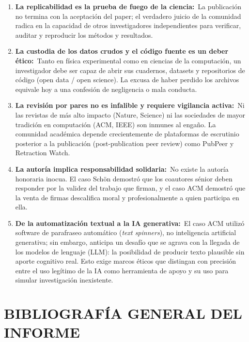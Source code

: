 \documentclass[12pt,a4paper]{article}
\newcommand{\itemlabel}[3]{\textbf{#1#2}~#3}
\let\oldsection\section
\renewcommand{\section}[1]{\needspace{5\baselineskip}\oldsection{#1}}
\begin{document}
\begin{enumerate}
\item \itemlabel{La replicabilidad es la prueba de fuego de la ciencia}{:}{La publicación no termina con la aceptación del paper; el verdadero juicio de la comunidad radica en la capacidad de otros investigadores independientes para verificar, auditar y reproducir los métodos y resultados.}
\item \itemlabel{La custodia de los datos crudos y el código fuente es un deber ético}{:}{Tanto en física experimental como en ciencias de la computación, un investigador debe ser capaz de abrir sus cuadernos, datasets y repositorios de código (open data / open science). La excusa de \textquotedbl{}haber perdido los archivos\textquotedbl{} equivale hoy a una confesión de negligencia o mala conducta.}
\item \itemlabel{La revisión por pares no es infalible y requiere vigilancia activa}{:}{Ni las revistas de más alto impacto (Nature, Science) ni las sociedades de mayor tradición en computación (ACM, IEEE) son inmunes al engaño. La comunidad académica depende crecientemente de plataformas de escrutinio posterior a la publicación (post-publication peer review) como PubPeer y Retraction Watch.}
\item \itemlabel{La autoría implica responsabilidad solidaria}{:}{No existe la autoría \textquotedbl{}honoraria\textquotedbl{} inocua. El caso Schön demostró que los coautores sénior deben responder por la validez del trabajo que firman, y el caso ACM demostró que la venta de firmas descalifica moral y profesionalmente a quien participa en ella.}
\item \itemlabel{De la automatización textual a la IA generativa}{:}{El caso ACM utilizó software de parafraseo automático (\textit{text spinners}), no inteligencia artificial generativa; sin embargo, anticipa un desafío que se agrava con la llegada de los modelos de lenguaje (LLM): la posibilidad de producir texto plausible sin aporte cognitivo real. Esto exige marcos éticos que distingan con precisión entre el uso legítimo de la IA como herramienta de apoyo y su uso para simular investigación inexistente.}
\end{enumerate}
\section{BIBLIOGRAFÍA GENERAL DEL INFORME}
\nocite{*}
\printbibliography[heading=none]
\end{document}
